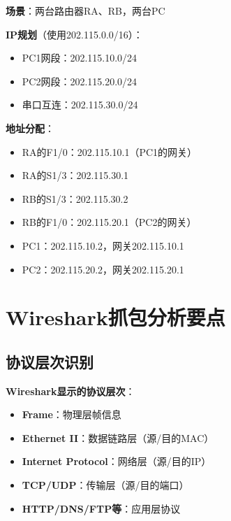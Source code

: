 \documentclass[12pt,a4paper]{ctexart}
\begin{document}
\begin{exambox}[典型实验IP规划]
\textbf{场景}：两台路由器RA、RB，两台PC

\textbf{IP规划}（使用202.115.0.0/16）：
\begin{itemize}[itemsep=0pt]
    \item PC1网段：202.115.10.0/24
    \item PC2网段：202.115.20.0/24
    \item 串口互连：202.115.30.0/24
\end{itemize}

\textbf{地址分配}：
\begin{itemize}[itemsep=0pt]
    \item RA的F1/0：202.115.10.1（PC1的网关）
    \item RA的S1/3：202.115.30.1
    \item RB的S1/3：202.115.30.2
    \item RB的F1/0：202.115.20.1（PC2的网关）
    \item PC1：202.115.10.2，网关202.115.10.1
    \item PC2：202.115.20.2，网关202.115.20.1
\end{itemize}
\end{exambox}

\section{Wireshark抓包分析要点}

\subsection{协议层次识别}

\begin{keybox}
\textbf{Wireshark显示的协议层次}：

\begin{itemize}[itemsep=0pt]
    \item \textbf{Frame}：物理层帧信息
    \item \textbf{Ethernet II}：数据链路层（源/目的MAC）
    \item \textbf{Internet Protocol}：网络层（源/目的IP）
    \item \textbf{TCP/UDP}：传输层（源/目的端口）
    \item \textbf{HTTP/DNS/FTP等}：应用层协议
\end{itemize}
\end{keybox}
\end{document}
